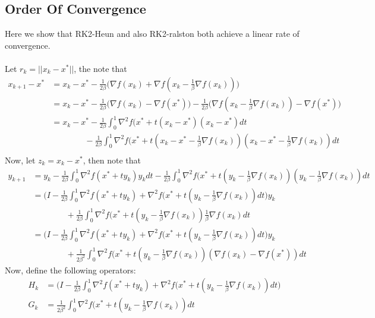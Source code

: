 \subsection{Order Of Convergence}
Here we show that RK2-Heun and also RK2-ralston both achieve a linear rate of convergence.
\\
\\
Let $r_k = || x_k - x^* ||$, the note that
\begin{equation}
\begin{aligned}
x_{k+1} - x^* &= x_{k} - x^* - \frac{1}{2\beta} \big( \nabla f(x_k) + \nabla f(x_k - \frac{1}{\beta} \nabla f(x_k))  \big)\\
 &= x_{k} - x^* - \frac{1}{2\beta} \big( \nabla f(x_k) - \nabla f(x^*) \big) - \frac{1}{2\beta} \big( \nabla f(x_k - \frac{1}{\beta} \nabla f(x_k)) - \nabla f(x^*) \big) \\
 &= x_{k} - x^* - \frac{1}{2\beta} \int_0^1 \nabla^2 f(x^* + t(x_k - x^*)(x_k - x^*)dt \\
& \quad \quad \quad \quad - \frac{1}{2\beta} \int_0^1 \nabla^2 f(x^* + t(x_k - x^* - \frac{1}{\beta} \nabla f(x_k) )(x_k - x^* - \frac{1}{\beta} \nabla f(x_k))dt \\
\end{aligned}
\end{equation}
Now, let $z_k = x_k - x^*$, then note that
\begin{equation}
\begin{aligned}
y_{k+1} &= y_k - \frac{1}{2\beta} \int_0^1 \nabla^2 f(x^* + ty_k)y_kdt - \frac{1}{2\beta} \int_0^1 \nabla^2 f(x^* + t(y_k - \frac{1}{\beta} \nabla f(x_k))(y_k - \frac{1}{\beta} \nabla f(x_k))dt \\
&= \big(I -  \frac{1}{2\beta} \int_0^1 \nabla^2 f(x^* + ty_k) + \nabla^2 f(x^* + t(y_k - \frac{1}{\beta} \nabla f(x_k)) dt  \big) y_k \\
& \quad \quad \quad \quad  + \frac{1}{2\beta} \int_0^1 \nabla^2 f(x^* + t(y_k - \frac{1}{\beta} \nabla f(x_k)) \frac{1}{\beta} \nabla f(x_k) dt \\
&= \big(I -  \frac{1}{2\beta} \int_0^1 \nabla^2 f(x^* + ty_k) + \nabla^2 f(x^* + t(y_k - \frac{1}{\beta} \nabla f(x_k)) dt  \big) y_k \\
& \quad \quad \quad \quad  + \frac{1}{2\beta^2} \int_0^1 \nabla^2 f(x^* + t(y_k - \frac{1}{\beta} \nabla f(x_k)) ( \nabla f(x_k)  - \nabla f(x^*) )dt
\end{aligned}
\end{equation}
Now, define the following operators:
\begin{equation}
\begin{aligned}
H_k &=  \big(I -  \frac{1}{2\beta} \int_0^1 \nabla^2 f(x^* + ty_k) + \nabla^2 f(x^* + t(y_k - \frac{1}{\beta} \nabla f(x_k)) dt  \big) \\
G_k &= \frac{1}{2\beta^2} \int_0^1 \nabla^2 f(x^* + t(y_k - \frac{1}{\beta} \nabla f(x_k)) dt
\end{aligned}
\end{equation}
